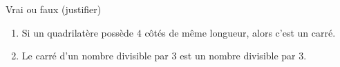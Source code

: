 
\begin{exercice}\label{exosmath-0791}

Vrai ou faux (justifier)
\begin{enumerate}
    \item
        Si un quadrilatère possède $4$ côtés de même longueur, alors c'est un carré.
    \item
        Le carré d'un nombre divisible par \( 3\) est un nombre divisible par \( 3\).
\end{enumerate}

\end{exercice}
